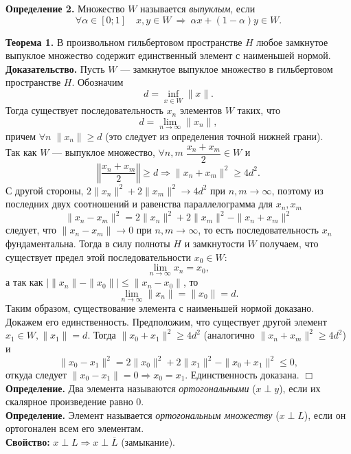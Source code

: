 \documentclass[12pt,a4paper, titlepage]{article}
\begin{document}
\textbf{Определение 2.} Множество $W$ называется \textit{выпуклым}, если
$$
\forall \alpha \in [0; 1] \quad x, y \in W \ \Rightarrow \ \alpha x + (1 - \alpha) y \in W.
$$

\textbf{Теорема 1.} В произвольном гильбертовом пространстве $H$ любое замкнутое выпуклое множество содержит единственный элемент с наименьшей нормой.\\

\textbf{Доказательство.} Пусть $W$ --- замкнутое выпуклое множество в гильбертовом пространстве $H$. Обозначим
$$
d = \inf_{x \in W} \|x\|.
$$
Тогда существует последовательность ${x_n}$ элементов $W$ таких, что 
$$
d = \lim_{n \to \infty}\|x_n\|,
$$
причем $\forall n \; \|x_n\| \geqslant d$ (это следует из определения точной нижней грани).\\

Так как $W$ --- выпуклое множество, $\forall n, m \; \dfrac{x_n + x_m}{2} \in W$ и 
$$
\left\Vert \frac{x_n + x_m}{2} \right\Vert \geqslant d \Rightarrow \|x_n + x_m\|^2 \geqslant 4d^2.
$$
С другой стороны, $2\|x_n\|^2 + 2\|x_m\|^2 \to 4d^2$ при $n, m \to \infty$, поэтому из последних двух соотношений и равенства параллелограмма для $x_n, x_m$
$$
\|x_n - x_m\|^2 = 2\|x_n\|^2 + 2\|x_m\|^2 - \|x_n + x_m\|^2
$$
следует, что $\|x_n - x_m\| \to 0$ при $n, m \to \infty$, то есть последовательность ${x_n}$ фундаментальна. Тогда в силу полноты $H$ и замкнутости $W$ получаем, что существует предел этой последовательности $x_0 \in W$:
$$
\lim_{n \to \infty} x_n = x_0,
$$
а так как $|\|x_n\| - \|x_0\|| \leqslant \|x_n - x_0\|$, то
$$
\lim_{n \to \infty} \|x_n\| = \|x_0\| = d.
$$
Таким образом, существование элемента с наименьшей нормой доказано. Докажем его единственность. Предположим, что существует другой элемент $x_1 \in W, \|x_1\| = d$. Тогда $\|x_0 + x_1\|^2 \geqslant 4d^2$ (аналогично $\|x_n + x_m\|^2 \geqslant 4d^2$) и 
$$
\|x_0 - x_1\|^2 = 2\|x_0\|^2 + 2\|x_1\|^2 - \|x_0 + x_1\|^2 \leqslant 0,
$$
откуда следует $\|x_0 - x_1\| = 0 \Rightarrow x_0 = x_1$. Единственность доказана. $\Box$\\

\textbf{Определение.} Два элемента называются \textit{ортогональными} ($x \perp y$), если их скалярное произведение равно 0. \\
\textbf{Определение.} Элемент называется \textit{ортогональным множеству} ($x \perp L$), если он ортогонален всем его элементам. \\
\textbf{Свойство:} $x \perp L \Rightarrow x \perp \overline{L}$ (замыкание).\\
\end{document}
